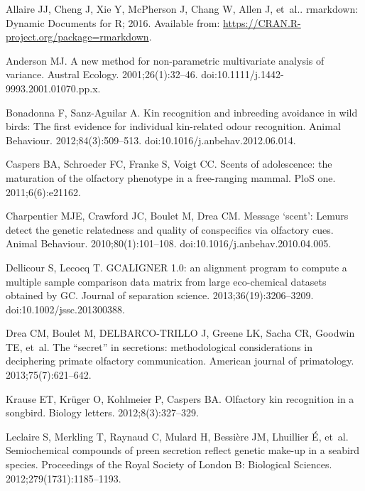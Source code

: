 \documentclass[10pt,letterpaper]{article}
\begin{document}
\nolinenumbers

\begin{thebibliography}{10}

Allaire JJ, Cheng J, Xie Y, McPherson J, Chang W, Allen J, et~al.. rmarkdown:
  Dynamic Documents for R; 2016.
\newblock Available from: \url{https://CRAN.R-project.org/package=rmarkdown}.

Anderson MJ.
\newblock A new method for non-parametric multivariate analysis of variance.
\newblock Austral Ecology. 2001;26(1):32--46.
\newblock doi:{10.1111/j.1442-9993.2001.01070.pp.x}.

Bonadonna F, Sanz-Aguilar A.
\newblock Kin recognition and inbreeding avoidance in wild birds: The first
  evidence for individual kin-related odour recognition.
\newblock Animal Behaviour. 2012;84(3):509--513.
\newblock doi:{10.1016/j.anbehav.2012.06.014}.

Caspers BA, Schroeder FC, Franke S, Voigt CC.
\newblock Scents of adolescence: the maturation of the olfactory phenotype in a
  free-ranging mammal.
\newblock PloS one. 2011;6(6):e21162.

Charpentier MJE, Crawford JC, Boulet M, Drea CM.
\newblock Message `scent': Lemurs detect the genetic relatedness and quality of
  conspecifics via olfactory cues.
\newblock Animal Behaviour. 2010;80(1):101--108.
\newblock doi:{10.1016/j.anbehav.2010.04.005}.

Dellicour S, Lecocq T.
\newblock GCALIGNER 1.0: an alignment program to compute a multiple sample
  comparison data matrix from large eco-chemical datasets obtained by GC.
\newblock Journal of separation science. 2013;36(19):3206--3209.
\newblock doi:{10.1002/jssc.201300388}.

Drea CM, Boulet M, DELBARCO-TRILLO J, Greene LK, Sacha CR, Goodwin TE, et~al.
\newblock The “secret” in secretions: methodological considerations in
  deciphering primate olfactory communication.
\newblock American journal of primatology. 2013;75(7):621--642.

Krause ET, Kr{\"u}ger O, Kohlmeier P, Caspers BA.
\newblock Olfactory kin recognition in a songbird.
\newblock Biology letters. 2012;8(3):327--329.

Leclaire S, Merkling T, Raynaud C, Mulard H, Bessi{\`e}re JM, Lhuillier {\'E},
  et~al.
\newblock Semiochemical compounds of preen secretion reflect genetic make-up in
  a seabird species.
\newblock Proceedings of the Royal Society of London B: Biological Sciences.
  2012;279(1731):1185--1193.


\end{thebibliography}
\end{document}
